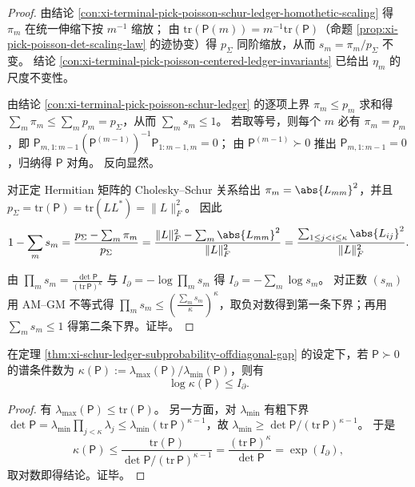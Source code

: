 \begin{proof}
由结论 \ref{con:xi-terminal-pick-poisson-schur-ledger-homothetic-scaling} 得 \(\pi_m\) 在统一伸缩下按 \(m^{-1}\) 缩放；
由 \(\mathrm{tr}(\mathsf P(m))=m^{-1}\mathrm{tr}(\mathsf P)\)（命题 \ref{prop:xi-pick-poisson-det-scaling-law} 的迹协变）得 \(p_\Sigma\) 同阶缩放，从而 \(s_m=\pi_m/p_\Sigma\) 不变。
结论 \ref{con:xi-terminal-pick-poisson-centered-ledger-invariants} 已给出 \(\eta_m\) 的尺度不变性。
\par
由结论 \ref{con:xi-terminal-pick-poisson-schur-ledger} 的逐项上界 \(\pi_m\le p_m\) 求和得 \(\sum_m\pi_m\le\sum_m p_m=p_\Sigma\)，从而 \(\sum_m s_m\le 1\)。
若取等号，则每个 \(m\) 必有 \(\pi_m=p_m\)，即
\(
\mathsf P_{m,1:m-1}(\mathsf P^{(m-1)})^{-1}\mathsf P_{1:m-1,m}=0
\)；
由 \(\mathsf P^{(m-1)}\succ 0\) 推出 \(\mathsf P_{m,1:m-1}=0\)，归纳得 \(\mathsf P\) 对角。
反向显然。
\par
对正定 Hermitian 矩阵的 Cholesky--Schur 关系给出 \(\pi_m=\abs{L_{mm}}^2\)，并且
\(
p_\Sigma=\mathrm{tr}(\mathsf P)=\mathrm{tr}(LL^\ast)=\|L\|_F^2
\)。
因此
\[
1-\sum_m s_m
=\frac{p_\Sigma-\sum_m\pi_m}{p_\Sigma}
=\frac{\|L\|_F^2-\sum_m\abs{L_{mm}}^2}{\|L\|_F^2}
=\frac{\sum_{1\le j<i\le\kappa}\abs{L_{ij}}^2}{\|L\|_F^2}.
\]
\par
由 \(\prod_m s_m=\frac{\det\mathsf P}{(\mathrm{tr}\,\mathsf P)^{\kappa}}\) 与 \(I_\partial=-\log\prod_m s_m\) 得 \(I_\partial=-\sum_m\log s_m\)。
对正数 \((s_m)\) 用 AM--GM 不等式得
\(
\prod_m s_m\le (\frac{\sum_m s_m}{\kappa})^\kappa
\)，取负对数得到第一条下界；再用 \(\sum_m s_m\le 1\) 得第二条下界。证毕。
\end{proof}

\begin{auditcor}[条件数的熵上界]\label{cor:xi-schur-ledger-condition-number-entropy-bound}
在定理 \ref{thm:xi-schur-ledger-subprobability-offdiagonal-gap} 的设定下，若 \(\mathsf P\succ 0\) 的谱条件数为
\(
\kappa(\mathsf P):=\lambda_{\max}(\mathsf P)/\lambda_{\min}(\mathsf P)
\)，则有
\[
\log \kappa(\mathsf P)\le I_\partial.
\]
\end{auditcor}
\begin{proof}
有 \(\lambda_{\max}(\mathsf P)\le \mathrm{tr}(\mathsf P)\)。
另一方面，对 \(\lambda_{\min}\) 有粗下界
\(
\det\mathsf P=\lambda_{\min}\prod_{j<\kappa}\lambda_j\le \lambda_{\min}(\mathrm{tr}\,\mathsf P)^{\kappa-1}
\)，故 \(\lambda_{\min}\ge \det\mathsf P/(\mathrm{tr}\,\mathsf P)^{\kappa-1}\)。
于是
\[
\kappa(\mathsf P)\le \frac{\mathrm{tr}(\mathsf P)}{\det\mathsf P/(\mathrm{tr}\,\mathsf P)^{\kappa-1}}
=\frac{(\mathrm{tr}\,\mathsf P)^{\kappa}}{\det\mathsf P}
=\exp(I_\partial),
\]
取对数即得结论。证毕。
\end{proof}

